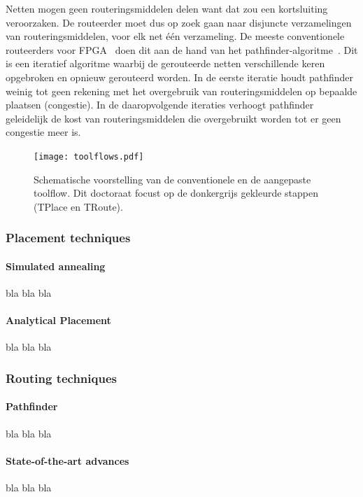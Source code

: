 \documentclass[a4paper,oneside,12pt]{article}
\begin{document}
Netten mogen geen routeringsmiddelen delen want dat zou een kortsluiting veroorzaken. De routeerder moet dus op zoek gaan naar disjuncte verzamelingen van routeringsmiddelen, voor elk net \'e\'en verzameling. De meeste conventionele routeerders voor FPGA~\cite{vprBVRJ, vprboek} doen dit aan de hand van het pathfinder-algoritme~\cite{pathfinder}. Dit is een iteratief algoritme waarbij de gerouteerde netten verschillende keren opgebroken en opnieuw gerouteerd worden. In de eerste iteratie houdt pathfinder weinig tot geen rekening met het overgebruik van routeringsmiddelen op bepaalde plaatsen (congestie). In de daaropvolgende iteraties verhoogt pathfinder geleidelijk de kost van routeringsmiddelen die overgebruikt worden tot er geen congestie meer is.

\begin{figure}[ht]
\centering
\texttt{[image: toolflows.pdf]}
\caption{Schematische voorstelling van de conventionele en de aangepaste toolflow. Dit doctoraat focust op de donkergrijs gekleurde stappen (TPlace en TRoute).}
\label{toolflows}
\end{figure}

\subsubsection{Placement techniques}\label{placementtech}

\paragraph{Simulated annealing}
bla bla bla

\paragraph{Analytical Placement}
bla bla bla

\subsubsection{Routing techniques}\label{routingtech}

\paragraph{Pathfinder}
bla bla bla

\paragraph{State-of-the-art advances}
bla bla bla
\end{document}
